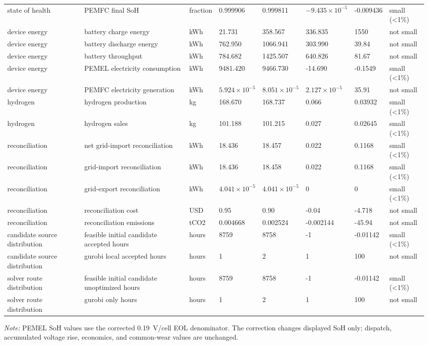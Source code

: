 \begin{longtable}{p{}p{}p{}p{}p{}p{}p{}p{}}
state of health & PEMFC final SoH & fraction & 0.999906 & 0.999811 & $-9.435\times10^{-5}$ & -0.009436 & small (<1\%) \\
device energy & battery charge energy & kWh & 21.731 & 358.567 & 336.835 & 1550 & not small \\
device energy & battery discharge energy & kWh & 762.950 & 1066.941 & 303.990 & 39.84 & not small \\
device energy & battery throughput & kWh & 784.682 & 1425.507 & 640.826 & 81.67 & not small \\
device energy & PEMEL electricity consumption & kWh & 9481.420 & 9466.730 & -14.690 & -0.1549 & small (<1\%) \\
device energy & PEMFC electricity generation & kWh & $5.924\times10^{-5}$ & $8.051\times10^{-5}$ & $2.127\times10^{-5}$ & 35.91 & not small \\
hydrogen & hydrogen production & kg & 168.670 & 168.737 & 0.066 & 0.03932 & small (<1\%) \\
hydrogen & hydrogen sales & kg & 101.188 & 101.215 & 0.027 & 0.02645 & small (<1\%) \\
reconciliation & net grid-import reconciliation & kWh & 18.436 & 18.457 & 0.022 & 0.1168 & small (<1\%) \\
reconciliation & grid-import reconciliation & kWh & 18.436 & 18.458 & 0.022 & 0.1168 & small (<1\%) \\
reconciliation & grid-export reconciliation & kWh & $4.041\times10^{-5}$ & $4.041\times10^{-5}$ & 0 & 0 & small (<1\%) \\
reconciliation & reconciliation cost & USD & 0.95 & 0.90 & -0.04 & -4.718 & not small \\
reconciliation & reconciliation emissions & tCO2 & 0.004668 & 0.002524 & -0.002144 & -45.94 & not small \\
candidate source distribution & feasible initial candidate accepted hours & hours & 8759 & 8758 & -1 & -0.01142 & small (<1\%) \\
candidate source distribution & gurobi local accepted hours & hours & 1 & 2 & 1 & 100 & not small \\
solver route distribution & feasible initial candidate unoptimized hours & hours & 8759 & 8758 & -1 & -0.01142 & small (<1\%) \\
solver route distribution & gurobi only hours & hours & 1 & 2 & 1 & 100 & not small \\
\bottomrule
\end{longtable}
\par\noindent\textit{Note:} PEMEL SoH values use the corrected
\SI{0.19}{V/cell} EOL denominator. The correction changes displayed SoH only;
dispatch, accumulated voltage rise, economics, and common-wear values are
unchanged.
